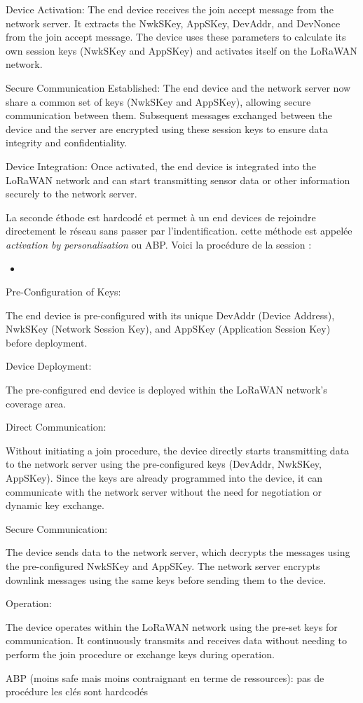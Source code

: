     Device Activation:
        The end device receives the join accept message from the network server.
        It extracts the NwkSKey, AppSKey, DevAddr, and DevNonce from the join accept message.
        The device uses these parameters to calculate its own session keys (NwkSKey and AppSKey) and activates itself on the LoRaWAN network.

    Secure Communication Established:
        The end device and the network server now share a common set of keys (NwkSKey and AppSKey), allowing secure communication between them.
        Subsequent messages exchanged between the device and the server are encrypted using these session keys to ensure data integrity and confidentiality.

    Device Integration:
        Once activated, the end device is integrated into the LoRaWAN network and can start transmitting sensor data or other information securely to the network server.
        
La seconde éthode est hardcodé et permet à un end devices de rejoindre directement le réseau sans passer par l'indentification. cette méthode est appelée \textit{activation by personalisation} ou ABP. Voici la procédure de la session :
\begin{itemize}
\item
\end{itemize}

Pre-Configuration of Keys:

    The end device is pre-configured with its unique DevAddr (Device Address), NwkSKey (Network Session Key), and AppSKey (Application Session Key) before deployment.

Device Deployment:

    The pre-configured end device is deployed within the LoRaWAN network's coverage area.

Direct Communication:

    Without initiating a join procedure, the device directly starts transmitting data to the network server using the pre-configured keys (DevAddr, NwkSKey, AppSKey).
    Since the keys are already programmed into the device, it can communicate with the network server without the need for negotiation or dynamic key exchange.

Secure Communication:

    The device sends data to the network server, which decrypts the messages using the pre-configured NwkSKey and AppSKey.
    The network server encrypts downlink messages using the same keys before sending them to the device.

Operation:

    The device operates within the LoRaWAN network using the pre-set keys for communication.
    It continuously transmits and receives data without needing to perform the join procedure or exchange keys during operation.

ABP (moins safe mais moins contraignant en terme de ressources):
pas de procédure
les clés sont hardcodés
